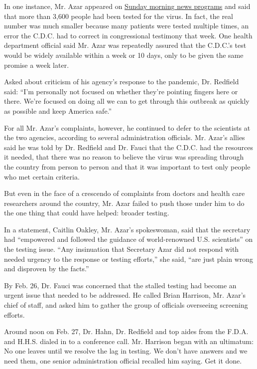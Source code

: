 In one instance, Mr. Azar appeared on
\href{https://www.cbsnews.com/news/transcript-alex-azar-on-face-the-nation-march-1-2020/?utm_source=dlvr.it\&utm_medium=twitter}{Sunday
morning news programs} and said that more than 3,600 people had been
tested for the virus. In fact, the real number was much smaller because
many patients were tested multiple times, an error the C.D.C. had to
correct in congressional testimony that week. One health department
official said Mr. Azar was repeatedly assured that the C.D.C.'s test
would be widely available within a week or 10 days, only to be given the
same promise a week later.

Asked about criticism of his agency's response to the pandemic, Dr.
Redfield said: ``I'm personally not focused on whether they're pointing
fingers here or there. We're focused on doing all we can to get through
this outbreak as quickly as possible and keep America safe.''

For all Mr. Azar's complaints, however, he continued to defer to the
scientists at the two agencies, according to several administration
officials. Mr. Azar's allies said he was told by Dr. Redfield and Dr.
Fauci that the C.D.C. had the resources it needed, that there was no
reason to believe the virus was spreading through the country from
person to person and that it was important to test only people who met
certain criteria.

But even in the face of a crescendo of complaints from doctors and
health care researchers around the country, Mr. Azar failed to push
those under him to do the one thing that could have helped: broader
testing.

In a statement, Caitlin Oakley, Mr. Azar's spokeswoman, said that the
secretary had ``empowered and followed the guidance of world-renowned
U.S. scientists'' on the testing issue. ``Any insinuation that Secretary
Azar did not respond with needed urgency to the response or testing
efforts,'' she said, ``are just plain wrong and disproven by the
facts.''

By Feb. 26, Dr. Fauci was concerned that the stalled testing had become
an urgent issue that needed to be addressed. He called Brian Harrison,
Mr. Azar's chief of staff, and asked him to gather the group of
officials overseeing screening efforts.

Around noon on Feb. 27, Dr. Hahn, Dr. Redfield and top aides from the
F.D.A. and H.H.S. dialed in to a conference call. Mr. Harrison began
with an ultimatum: No one leaves until we resolve the lag in testing. We
don't have answers and we need them, one senior administration official
recalled him saying. Get it done.

